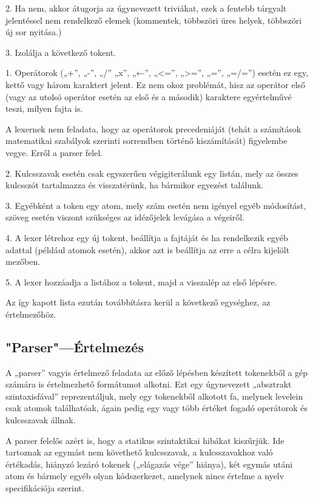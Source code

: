     2. Ha nem, akkor átugorja az úgynevezett triviákat, ezek a fentebb tárgyalt jelentéssel nem rendelkező elemek (kommentek, többszöri üres helyek, többszöri új sor nyitása.)

    3. Izolálja a következő tokent.

        1. Operátorok („+”, „-”, „/” „x”, „←”, „<=”, „>=”, „=”, „=/=”) esetén ez egy, kettő vagy három karaktert jelent. Ez nem okoz problémát, hisz az operátor első (vagy az utolsó operátor esetén az első és a második) karaktere egyértelművé teszi, milyen fajta is.

A lexernek nem feladata, hogy az operátorok precedeniáját (tehát a számítások matematikai szabályok szerinti sorrendben történő kiszámítását) figyelembe vegye. Erről a parser felel.

        2. Kulcsszavak esetén csak egyszerűen végigiterálunk egy listán, mely az összes kulcsszót tartalmazza és visszatérünk, ha bármikor egyezést találunk.

        3. Egyébként a token egy atom, mely szám esetén nem igényel egyéb módosítást, szöveg esetén viszont szükséges az idézőjelek levágása a végeiről.

    4. A lexer létrehoz egy új tokent, beállítja a fajtáját és ha rendelkezik egyéb adattal (például atomok esetén), akkor azt is beállítja az erre a célra kijelölt mezőben.

    5. A lexer hozzáadja a listához a tokent, majd a visszalép az első lépésre.

Az így kapott lista ezután továbbításra kerül a következő egységhez, az értelmezőhöz.

\subsection{"Parser"—Értelmezés}

A „parser” vagyis értelmező feladata az előző lépésben készített tokenekből a gép számára is értelmezhető formátumot alkotni. Ezt egy úgynevezett „absztrakt szintaxisfával” reprezentáljuk, mely egy tokenekből alkotott fa, melynek levelein csak atomok találhatóak, ágain pedig egy vagy több értéket fogadó operátorok és kulcsszavak állnak.

A parser felelős azért is, hogy a statikus szintaktikai hibákat kiszűrjük. Ide tartoznak az egymást nem követhető kulcsszavak, a kulcsszavakhoz való értékadás, hiányzó lezáró tokenek („elágazás vége” hiánya), két egymás utáni atom és bármely egyéb olyan kódszerkezet, amelynek nincs értelme a nyelv specifikációja szerint.

